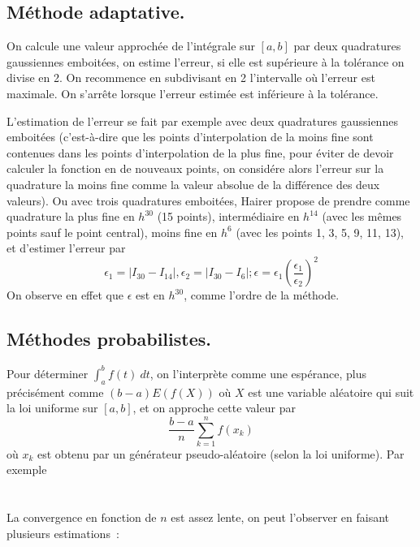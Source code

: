 \documentclass[a4paper,11pt]{article}
\begin{document}
\begin{giacjshere}
\subsection{M\'ethode adaptative.}
On calcule une valeur approch\'ee de l'int\'egrale sur $[a,b]$ par
deux quadratures gaussiennes emboit\'ees, on estime l'erreur,
si elle est sup\'erieure \`a la tol\'erance on divise en 2. On
recommence en subdivisant en 2 l'intervalle o\`u l'erreur est
maximale. On s'arr\^ete lorsque l'erreur estim\'ee est inf\'erieure
\`a la tol\'erance.

L'estimation de l'erreur se fait par exemple avec deux quadratures
gaussiennes emboit\'ees (c'est-\`a-dire que les points d'interpolation
de la moins fine sont contenues dans les points d'interpolation de la
plus fine, pour \'eviter de devoir calculer la fonction en de nouveaux
points, on consid\'ere alors l'erreur sur la quadrature la moins fine
comme la valeur absolue de la diff\'erence des deux valeurs). Ou avec
trois quadratures emboit\'ees,
Hairer propose de prendre comme quadrature la plus fine en $h^{30}$
(15 points), interm\'ediaire en $h^{14}$ (avec les m\^emes points
sauf le point central), moins fine en $h^6$ (avec les points 1, 3, 5,
9, 11, 13), et d'estimer l'erreur par 
$$ \epsilon_1=| I_{30}-I_{14}|,  \epsilon_2=| I_{30}-I_{6}|; 
\epsilon = \epsilon_1 \left(\frac{\epsilon_1}{\epsilon_2} \right)^2 $$
On observe en effet que $\epsilon$ est en $h^{30}$, comme
l'ordre de la m\'ethode.

\subsection{M\'ethodes probabilistes.} 
Pour d\'eterminer $\int_a^b f(t) \ dt $, on l'interpr\`ete comme
une esp\'erance, plus pr\'ecis\'ement comme $(b-a)E(f(X))$ 
o\`u $X$ est une variable al\'eatoire
qui suit la loi uniforme sur $[a,b]$, et on approche cette valeur
par 
$$ \frac{b-a}{n} \sum_{k=1}^n f(x_k) $$
o\`u $x_k$ est obtenu par un g\'en\'erateur pseudo-al\'eatoire
(selon la loi uniforme).
Par exemple\\
\\
\\
La convergence en fonction de $n$ est assez lente, on peut l'observer
en faisant plusieurs estimations~:\\
\\


\end{giacjshere}
\end{document}
